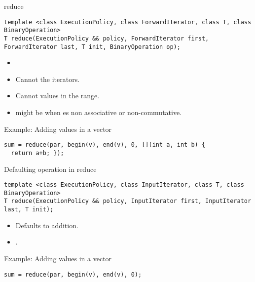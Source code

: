 \begin{frame}[t,fragile]{reduce}
\begin{lstlisting}[]
template <class ExecutionPolicy, class ForwardIterator, class T, class BinaryOperation>
T reduce(ExecutionPolicy && policy, ForwardIterator first, ForwardIterator last, T init, BinaryOperation op);
\end{lstlisting}
\begin{itemize}
  \item {}
  \item {} Cannot  the iterators.
  \item {} Cannot  values in the range.
  \item {} might be  when  es non associative or non-commutative.
\end{itemize}
\begin{block}{Example: Adding values in a vector}
\begin{lstlisting}[]
sum = reduce(par, begin(v), end(v), 0, [](int a, int b) { 
  return a+b; });
\end{lstlisting}
\end{block}
\end{frame}

\begin{frame}[t,fragile]{Defaulting operation in reduce}
\begin{lstlisting}[]
template <class ExecutionPolicy, class InputIterator, class T, class BinaryOperation>
T reduce(ExecutionPolicy && policy, InputIterator first, InputIterator last, T init);
\end{lstlisting}
\begin{itemize}
  \item Defaults to addition.
  \item {}.
\end{itemize}
\vfill
\begin{block}{Example: Adding values in a vector}
\begin{lstlisting}[]
sum = reduce(par, begin(v), end(v), 0);
\end{lstlisting}
\end{block}
\end{frame}

